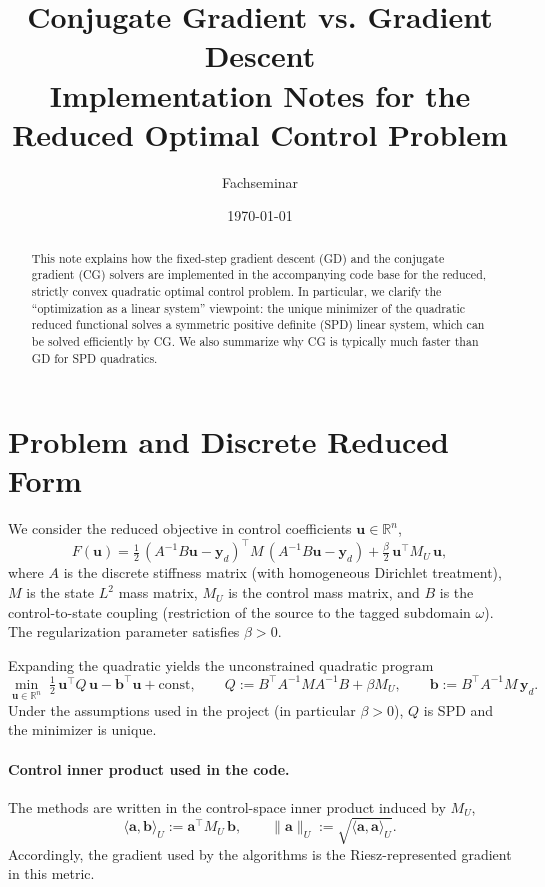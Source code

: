 \documentclass[11pt,a4paper]{article}
\title{Conjugate Gradient vs. Gradient Descent\\Implementation Notes for the Reduced Optimal Control Problem}
\author{Fachseminar}
\date{\today}
\begin{document}
\maketitle
{}

\begin{abstract}
This note explains how the fixed-step gradient descent (GD) and the conjugate gradient (CG) solvers are implemented in the accompanying code base for the reduced, strictly convex quadratic optimal control problem. In particular, we clarify the ``optimization as a linear system'' viewpoint: the unique minimizer of the quadratic reduced functional solves a symmetric positive definite (SPD) linear system, which can be solved efficiently by CG. We also summarize why CG is typically much faster than GD for SPD quadratics.
\end{abstract}

\section{Problem and Discrete Reduced Form}
We consider the reduced objective in control coefficients $\mathbf{u}\in\mathbb{R}^n$,
\begin{equation}
  F(\mathbf{u})
  = \tfrac12\, (A^{-1}B\mathbf{u}-\mathbf{y}_d)^\top M\,(A^{-1}B\mathbf{u}-\mathbf{y}_d)
    + \tfrac\beta2\, \mathbf{u}^\top M_U\,\mathbf{u},
\end{equation}
where $A$ is the discrete stiffness matrix (with homogeneous Dirichlet treatment), $M$ is the state $L^2$ mass matrix, $M_U$ is the control mass matrix, and $B$ is the control-to-state coupling (restriction of the source to the tagged subdomain $\omega$). The regularization parameter satisfies $\beta>0$.

Expanding the quadratic yields the unconstrained quadratic program
\begin{equation}
  \min_{\mathbf{u}\in\mathbb{R}^n}\; \tfrac12\,\mathbf{u}^\top Q\,\mathbf{u} - \mathbf{b}^\top\mathbf{u} + \text{const},
  \qquad
  Q := B^\top A^{-1}MA^{-1}B + \beta M_U,
  \qquad
  \mathbf{b} := B^\top A^{-1}M\,\mathbf{y}_d.
  \label{eq:qp}
\end{equation}
Under the assumptions used in the project (in particular $\beta>0$), $Q$ is SPD and the minimizer is unique.

\paragraph{Control inner product used in the code.}
The methods are written in the control-space inner product induced by $M_U$,
\begin{equation}
  \langle \mathbf{a},\mathbf{b}\rangle_U := \mathbf{a}^\top M_U\,\mathbf{b},
  \qquad
  \|\mathbf{a}\|_U := \sqrt{\langle \mathbf{a},\mathbf{a}\rangle_U}.
\end{equation}
Accordingly, the gradient used by the algorithms is the Riesz-represented gradient in this metric.
\end{document}
